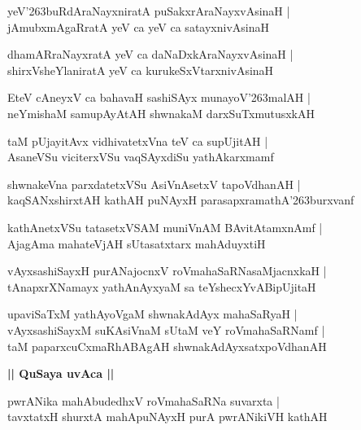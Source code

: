 \documentclass[twoside,12pt,openright]{book}
\newcounter{shloka}[chapter]
\def\uvaca#1{\centerline{{\large\textbf{#1}}}}
\begin{document}

\begin{shloka}
yeV\char'263buRdAraNayxniratA puSakxrAraNayxvAsinaH |\\
jAmubxmAgaRratA yeV ca yeV ca satayxnivAsinaH 
\end{shloka}

\begin{shloka}
dhamARraNayxratA yeV ca daNaDxkAraNayxvAsinaH |\\
shirxVsheYlaniratA yeV ca kurukeSxVtarxnivAsinaH 
\end{shloka}

\begin{shloka}
EteV cAneyxV ca bahavaH sashiSAyx munayoV\char'263malAH |\\
neYmishaM samupAyAtAH shwnakaM darxSuTxmutusxkAH 
\end{shloka}

\begin{shloka}
taM pUjayitAvx vidhivatetxVna teV ca supUjitAH |\\
AsaneVSu viciterxVSu vaqSAyxdiSu yathAkarxmamf 
\end{shloka}

\begin{shloka}
shwnakeVna parxdatetxVSu AsiVnAsetxV tapoVdhanAH |\\
kaqSANxshirxtAH kathAH puNAyxH parasapxramathA\char'263burxvanf 
\end{shloka}

\begin{shloka}
kathAnetxVSu tatasetxVSAM muniVnAM BAvitAtamxnAmf |\\
AjagAma mahateVjAH sUtasatxtarx mahAduyxtiH 
\end{shloka}

\begin{shloka}
vAyxsashiSayxH purANajocnxV roVmahaSaRNasaMjacnxkaH |\\
tAnapxrXNamayx yathAnAyxyaM sa teYshecxYvABipUjitaH 
\end{shloka}

\begin{shloka}
upaviSaTxM yathAyoVgaM shwnakAdAyx mahaSaRyaH |\\
vAyxsashiSayxM suKAsiVnaM sUtaM veY roVmahaSaRNamf |\\
taM paparxcuCxmaRhABAgAH shwnakAdAyxsatxpoVdhanAH 
\end{shloka}

\uvaca{|| QuSaya uvAca ||}

\begin{shloka}
pwrANika mahAbudedhxV roVmahaSaRNa suvarxta |\\
tavxtatxH shurxtA mahApuNAyxH purA pwrANikiVH kathAH 
\end{shloka}
\end{document}
